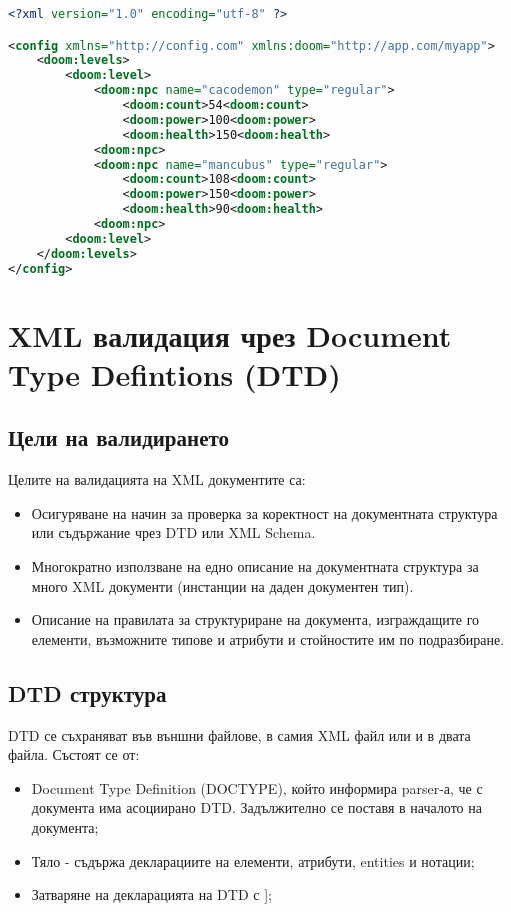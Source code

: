 \documentclass[fleqn,12pt]{article}
\begin{document}
\begin{lstlisting}[language=XML, caption=Doom namespace]
<?xml version="1.0" encoding="utf-8" ?>

<config xmlns="http://config.com" xmlns:doom="http://app.com/myapp">
    <doom:levels>
        <doom:level>
            <doom:npc name="cacodemon" type="regular">
                <doom:count>54<doom:count>
                <doom:power>100<doom:power>
                <doom:health>150<doom:health>
            <doom:npc>
            <doom:npc name="mancubus" type="regular">
                <doom:count>108<doom:count>
                <doom:power>150<doom:power>
                <doom:health>90<doom:health>
            <doom:npc>
        <doom:level>
    </doom:levels>
</config>
\end{lstlisting}


\section{XML валидация чрез Document Type Defintions (DTD)}

\subsection{Цели на валидирането}

Целите на валидацията на XML документите са:
\begin{itemize}
    \item Осигуряване на начин за проверка за коректност на документната структура или съдържание чрез DTD или XML Schema.
    \item Многократно използване на едно описание на документната структура за много XML документи (инстанции на даден документен тип).
    \item Описание на правилата за структуриране на документа, изграждащите го елементи, възможните типове и атрибути и стойностите им по подразбиране.
\end{itemize}


\subsection{DTD структура}

DTD се съхраняват във външни файлове, в самия XML файл или и в двата файла. Състоят се от:
\begin{itemize}
    \item Document Type Definition (DOCTYPE), който информира parser-а, че с документа има асоциирано DTD. Задължително се поставя в началото на документа;
    \item Тяло - съдържа декларациите на елементи, атрибути, entities и нотации;
    \item Затваряне на декларацията на DTD с ];
\end{itemize}
\end{document}
